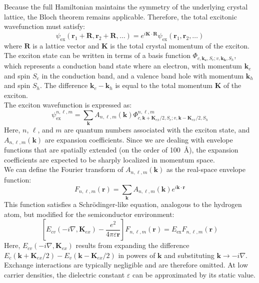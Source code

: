 Because the full Hamiltonian maintains the symmetry of the underlying crystal lattice, the Bloch theorem remains applicable. Therefore, the total excitonic wavefunction must satisfy:
\begin{equation}
	\psi_{\text{ex}}(\mathbf{r}_1 + \mathbf{R}, \mathbf{r}_2 + \mathbf{R}, \dots) = e^{i\mathbf{K} \cdot \mathbf{R}} \psi_{\text{ex}}(\mathbf{r}_1, \mathbf{r}_2, \dots)
\end{equation}
where \( \mathbf{R} \) is a lattice vector and \( \mathbf{K} \) is the total crystal momentum of the exciton.
The exciton state can be written in terms of a basis function \( \Phi_{c,\mathbf{k_e}, S_e; v,\mathbf{k_h}, S_h} \), which represents a conduction band state where an electron, with momentum \(\mathbf{k}_e\) and spin \(S_e\) in the conduction band, and a valence band hole with momentum \(\mathbf{k}_h\) and spin \(S_h\). The difference \( \mathbf{k}_e - \mathbf{k}_h \) is equal to the total momentum \( \mathbf{K} \) of the exciton.\\
The exciton wavefunction is expressed as:
\begin{equation}
	\psi_{\text{ex}}^{n,\ell,m} = \sum_{\mathbf{k}} A_{n,\ell,m}(\mathbf{k}) \Phi^{n,\ell,m}_{c,\mathbf{k}+\mathbf{K}_{ex}/2,S_e; v,\mathbf{k}-\mathbf{K}_{ex}/2,S_h}
\end{equation}
Here, \( n \), \( \ell \), and \( m \) are quantum numbers associated with the exciton state, and \( A_{n,\ell,m}(\mathbf{k}) \) are expansion coefficients. Since we are dealing with envelope functions that are spatially extended (on the order of 100~\AA), the expansion coefficients are expected to be sharply localized in momentum space.\\
We can define the Fourier transform of \( A_{n,\ell,m}(\mathbf{k}) \) as the real-space envelope function:
\begin{equation}
	F_{n,\ell,m}(\mathbf{r}) = \sum_{\mathbf{k}} A_{n,\ell,m}(\mathbf{k}) e^{i \mathbf{k} \cdot \mathbf{r}}
\end{equation}
This function satisfies a Schrödinger-like equation, analogous to the hydrogen atom, but modified for the semiconductor environment:
\begin{equation}
	\left[ E_{cv}(-i\nabla, \mathbf{K}_{ex}) - \frac{e^2}{4\pi \varepsilon \mathbf{r}} \right] F_{n,\ell,m}(\mathbf{r}) = E_{\text{ex}} F_{n,\ell,m}(\mathbf{r})
\end{equation}
Here, \( E_{cv}(-i\nabla, \mathbf{K}_{ex}) \) results from expanding the difference \( E_c(\mathbf{k} + \mathbf{K}_{ex}/2) - E_v(\mathbf{k} - \mathbf{K}_{ex}/2) \) in powers of \( \mathbf{k} \) and substituting \( \mathbf{k} \rightarrow -i\nabla \). Exchange interactions are typically negligible and are therefore omitted. At low carrier densities, the dielectric constant \( \varepsilon \) can be approximated by its static value.\\
